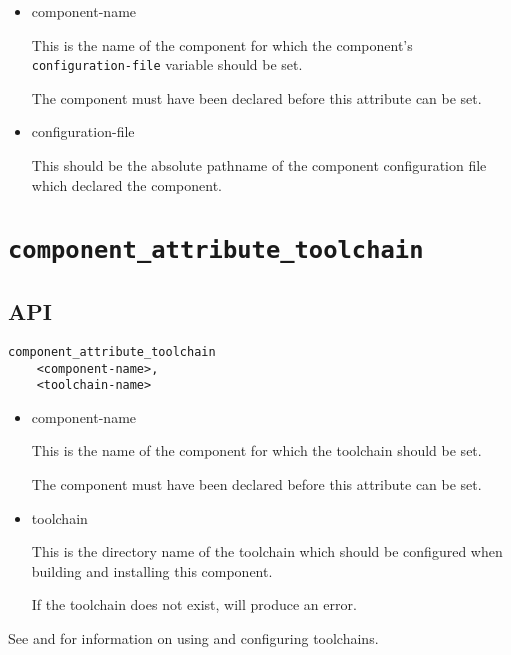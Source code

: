 \begin{itemize}
\item component-name

  This is the name of the component for which the component's
  \texttt{configuration-file} variable should be set.

  The component must have been declared before this attribute can be
  set.

\item configuration-file

  This should be the absolute pathname of the component configuration
  file which declared the component.

\end{itemize}


\section{\texttt{component\_attribute\_toolchain}}\label{api:toolchain}

\subsection{API}

\begin{verbatim}
component_attribute_toolchain
    <component-name>,
    <toolchain-name>
\end{verbatim}

\begin{itemize}
\item component-name

  This is the name of the component for which the toolchain should be
  set.

  The component must have been declared before this attribute can be
  set.

\item toolchain

  This is the directory name of the toolchain which should be
  configured when building and installing this component.

  If the toolchain does not exist, \lmsbw will produce an
  error.
\end{itemize}

See  and
 for information on using and
configuring toolchains.

